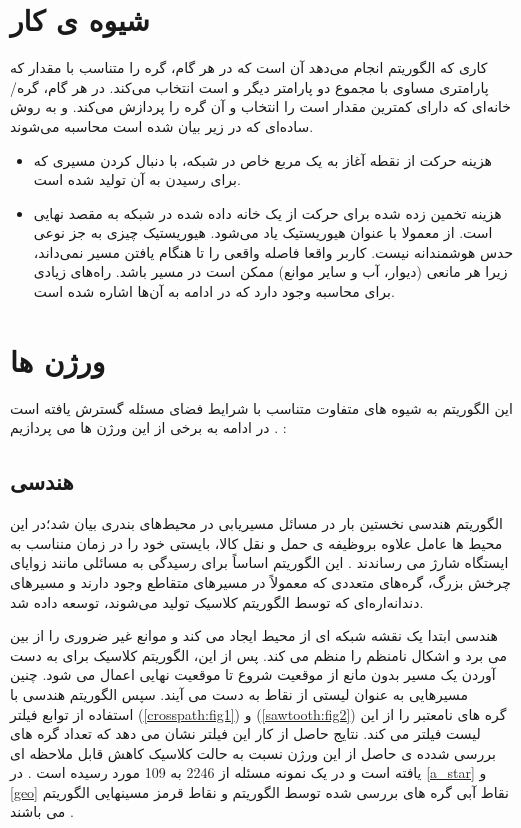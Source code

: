 \section{شیوه ی کار}
کاری که الگوریتم  انجام می‌دهد آن است که در هر گام، گره را متناسب با مقدار 
که پارامتری مساوی با مجموع دو پارامتر دیگر  و  است انتخاب می‌کند. در هر گام، گره/خانه‌ای که دارای کمترین مقدار است را انتخاب و آن گره را پردازش می‌کند.  و  به روش ساده‌ای که در زیر بیان شده است محاسبه می‌شوند.
\begin{itemize}
	\item{}
	 هزینه حرکت از نقطه آغاز به یک مربع خاص در شبکه، با دنبال کردن مسیری که برای رسیدن به آن تولید شده است.
		\item{}
		 هزینه تخمین زده شده برای حرکت از یک خانه داده شده در شبکه به مقصد نهایی است. از  معمولا با عنوان هیوریستیک یاد می‌شود. هیوریستیک چیزی به جز نوعی حدس هوشمندانه نیست. کاربر واقعا فاصله واقعی را تا هنگام یافتن مسیر نمی‌داند، زیرا هر مانعی (دیوار، آب و سایر موانع) ممکن است در مسیر باشد. راه‌های زیادی برای محاسبه  وجود دارد که در ادامه به آن‌ها اشاره شده است.
\end{itemize}


\section{ورژن ها}
این الگوریتم به شیوه های متفاوت متناسب با شرایط فضای مسئله گسترش یافته است . در ادامه به برخی از این ورژن ها می پردازیم :




\subsection{هندسی}
الگوریتم هندسی   نخستین بار در مسائل مسیریابی در محیط‌های بندری بیان شد؛در این محیط ها عامل علاوه بروظیفه ی حمل و نقل کالا، بایستی خود را در زمان منناسب به ایستگاه شارژ می رساندند . این الگوریتم اساساً برای رسیدگی به مسائلی مانند زوایای چرخش بزرگ، گره‌های متعددی که معمولاً در مسیرهای متقاطع وجود دارند و مسیرهای دندانه‌اره‌ای که توسط الگوریتم کلاسیک   تولید می‌شوند، توسعه داده شد.  
\par
{} هندسی ابتدا یک نقشه شبکه ای از محیط ایجاد می کند و موانع غیر ضروری را از بین می برد و اشکال نامنظم را منظم می کند. پس از این، الگوریتم کلاسیک   برای به دست آوردن یک مسیر بدون مانع از موقعیت شروع تا موقعیت نهایی اعمال می شود. چنین مسیرهایی به عنوان لیستی از نقاط به دست می آیند. سپس الگوریتم هندسی   با استفاده از توابع فیلتر
(\ref{crosspath:fig1})
و
(\ref{sawtooth:fig2})
گره های نامعتبر را از این لیست فیلتر می کند. نتایج حاصل از کار این فیلتر نشان می دهد که تعداد گره های بررسی شدده ی حاصل از این ورژن نسبت به حالت کلاسیک کاهش قابل ملاحظه ای یافته است و در یک نمونه مسئله از 2246 به 109 مورد رسیده است . در 
\ref{a_star}
و
\ref{geo}
نقاط آبی گره های بررسی شده توسط الگوریتم و نقاط قرمز مسینهایی الگوریتم می باشند .

